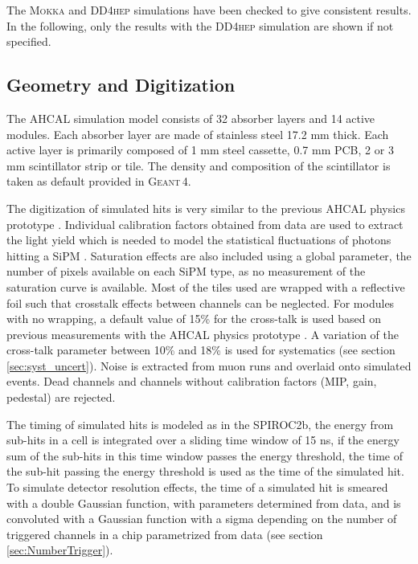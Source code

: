 \documentclass{JINST}
\newcommand\geant{\textsc{Geant\,4}\xspace}
\newcommand\mokka{\textsc{Mokka}\xspace}
\newcommand\ddhep{\textsc{DD4hep}\xspace}
\begin{document}
The \mokka and \ddhep simulations have been checked to give consistent results. In the following, only the results with the \ddhep simulation are shown if not specified.

\subsection{Geometry and Digitization}
\label{sec:GeoDigi}

The AHCAL simulation model consists of 32 absorber layers and 14 active modules. Each absorber layer are made of stainless steel 17.2 mm thick. Each active layer is primarily composed of 1 mm steel cassette, 0.7 mm PCB, 2 or 3 mm scintillator strip or tile. The density and composition of the scintillator is taken as default provided in \geant.

The digitization of simulated hits is very similar to the previous AHCAL physics prototype \cite{1748-0221-5-05-P05004}. Individual calibration factors obtained from data are used to extract the light yield which is needed to model the statistical fluctuations of photons hitting a SiPM \cite{Hartbrich:2016bbz}. Saturation effects are also included using a global parameter, the number of pixels available on each SiPM type, as no measurement of the saturation curve is available. Most of the tiles used are wrapped with a reflective foil such that crosstalk effects between channels can be neglected. For modules with no wrapping, a default value of 15\% for the cross-talk is used based on previous measurements with the AHCAL physics prototype \cite{Gunter:2015ika}. A variation of the cross-talk parameter between 10\% and 18\% is used for systematics (see section \ref{sec:syst_uncert}). Noise is extracted from muon runs and overlaid onto simulated events. Dead channels and channels without calibration factors (MIP, gain, pedestal) are rejected.

The timing of simulated hits is modeled as in the SPIROC2b, the energy from sub-hits in a cell is integrated over a sliding time window of 15 ns, if the energy sum of the sub-hits in this time window passes the energy threshold, the time of the sub-hit passing the energy threshold is used as the time of the simulated hit. To simulate detector resolution effects, the time of a simulated hit is smeared with a double Gaussian function, with parameters determined from data, and is convoluted with a Gaussian function with a sigma depending on the number of triggered channels in a chip parametrized from data (see section \ref{sec:NumberTrigger}).
\end{document}
